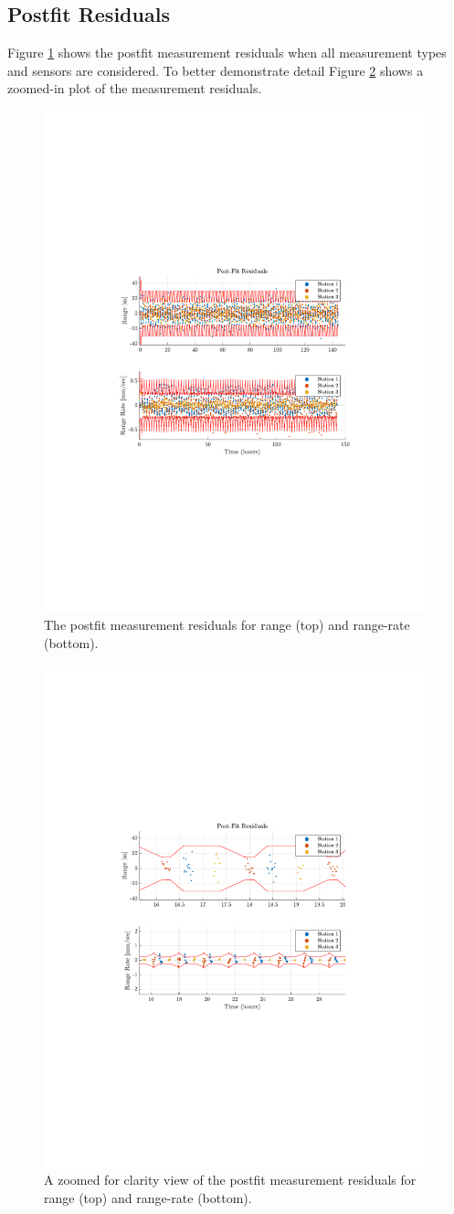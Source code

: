 \documentclass[11pt]{article}
\begin{document}

\subsection{Postfit Residuals}

Figure \ref{fig:postfit} shows the postfit measurement residuals when all measurement types and sensors are considered. To better demonstrate detail Figure \ref{fig:postfit_zoom} shows a zoomed-in plot of the measurement residuals.

\begin{figure}[!htb]
	\centering
	\includegraphics[clip,trim=4cm 8.5cm 4cm 8.5cm, width=.5\textwidth]{figs/postfit_res_final.pdf}
	\caption{The postfit measurement residuals for range (top) and range-rate (bottom).}
	\label{fig:postfit}
\end{figure}

\begin{figure}[!htb]
	\centering
	\includegraphics[clip,trim=4cm 8.5cm 4cm 8.5cm, width=.5\textwidth]{figs/postfit_res_zoom1_final.pdf}
	\caption{A zoomed for clarity view of the postfit measurement residuals for range (top) and range-rate (bottom).}
	\label{fig:postfit_zoom}
\end{figure}
\end{document}
